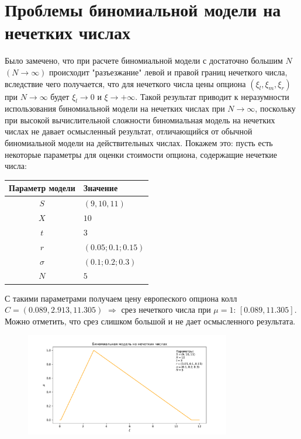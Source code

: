 \documentclass[a4paper,12pt]{extarticle} %
\begin{document}
	\section{Проблемы биномиальной модели на нечетких числах}
	Было замечено, что при расчете биномиальной модели с достаточно большим $N$ $(N \to \infty)$ происходит "разъезжание" левой и правой границ нечеткого числа, вследствие чего получается, что для нечеткого числа цены опциона $(\xi_l, \xi_m, \xi_r)$ при $N \to \infty$ будет $\xi_l \to 0$ и $\xi \to +\infty$. Такой результат приводит к неразумности использования биномиальной модели на нечетких числах при $N \to \infty$, поскольку при высокой вычислительной сложности биномиальная модель на нечетких числах не давает осмысленный результат, отличающийся от обычной биномиальной модели на действительных числах. Покажем это: пусть есть некоторые параметры для оценки стоимости опциона, содержащие нечеткие числа:
	\begin{center}
		\begin{tabular}{|c|l|}
			\hline
			\textbf{Параметр модели} & \textbf{Значение} \\
			\hline
			$S$ & $(9, 10, 11)$ \\
			$X$ & $10$ \\
			$t$ & $3$ \\
			$r$ & $(0.05; 0.1; 0.15)$ \\
			$\sigma$ & $(0.1; 0.2; 0.3)$ \\
			$N$ & $5$ \\
			\hline
		\end{tabular}
	\end{center}
	
	С такими параметрами получаем цену европеского опциона колл $C=(0.089, 2.913, 11.305)$ $\Rightarrow$ срез нечеткого числа при $\mu=1$: $[0.089, 11.305]$. Можно отметить, что срез слишком большой и не дает осмысленного результата.
	\begin{figure}[H]
		\centering
		\includegraphics[width=0.8\textwidth]{_images/fuzzy-binomial.pdf}
	\end{figure}
	
\end{document}
